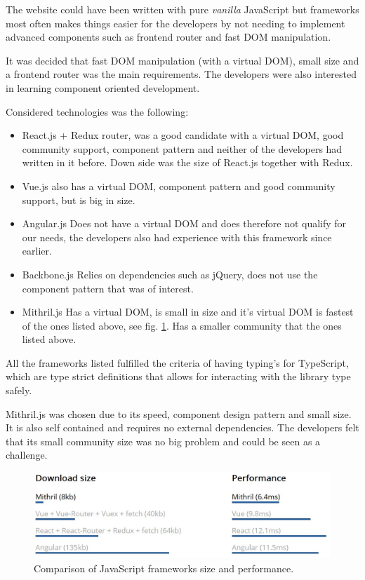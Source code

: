 \documentclass[12pt,a4paper]{report}
\begin{document}
The website could have been written with pure \textit{vanilla} JavaScript but frameworks most often makes things easier for the developers by not needing to implement advanced components such as frontend router and fast DOM manipulation.

It was decided that fast DOM manipulation (with a virtual DOM), small size and a frontend router was the main requirements. The developers were also interested in learning component oriented development.

Considered technologies was the following:
\begin{itemize}
    \item React.js + Redux router, was a good candidate with a virtual DOM, good community support, component pattern and neither of the developers had written in it before. Down side was the size of React.js together with Redux.
    \item Vue.js also has a virtual DOM, component pattern and good community support, but is big in size.
    \item Angular.js Does not have a virtual DOM and does therefore not qualify for our needs, the developers also had experience with this framework since earlier.
    \item Backbone.js Relies on dependencies such as jQuery, does not use the component pattern that was of interest.
    \item Mithril.js Has a virtual DOM, is small in size and it's virtual DOM is fastest of the ones listed above, see fig. \ref{fig:js-comp}. Has a smaller community that the ones listed above.
\end{itemize}

All the frameworks listed fulfilled the criteria of having typing's for TypeScript, which are type strict definitions that allows for interacting with the library type safely.

Mithril.js\cite{mithril-js} was chosen due to its speed, component design pattern and small size. It is also self contained and requires no external dependencies. The developers felt that its small community size was no big problem and could be seen as a challenge.

\begin{figure}[H]
    \centering
    \includegraphics[width=14cm]{mithril-js-perf.jpg}
    \caption{Comparison of JavaScript frameworks size and performance\cite{mithril-speed}.}
    \label{fig:js-comp}
\end{figure}
\end{document}
